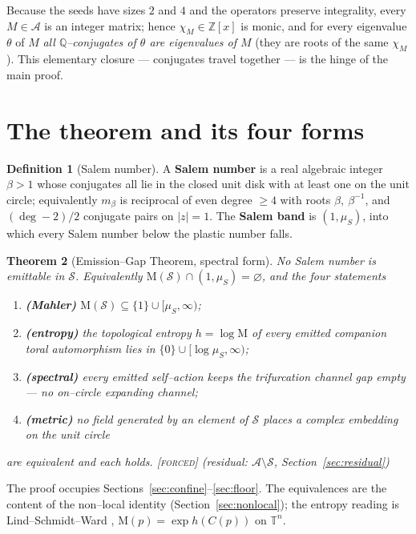 \documentclass[11pt]{article}
\theoremstyle{plain}
\newtheorem{theorem}{Theorem}[section]
\theoremstyle{definition}
\newtheorem{definition}[theorem]{Definition}
\theoremstyle{remark}
\newcommand{\forced}{\textcolor{forcedc}{\textsc{[forced]}}}
\newcommand{\Q}{\mathbb{Q}}
\newcommand{\Z}{\mathbb{Z}}
\newcommand{\T}{\mathbb{T}}
\newcommand{\Mah}{\mathrm{M}}
\newcommand{\charp}{\chi}
\newcommand{\abs}[1]{\left\lvert #1 \right\rvert}
\newcommand{\Scal}{\mathcal{S}}
\newcommand{\Acal}{\mathcal{A}}
\begin{document}
Because the seeds have sizes $2$ and $4$ and the operators preserve integrality, every $M\in\Acal$ is an integer matrix; hence $\charp_M\in\Z[x]$ is monic, and for every eigenvalue $\theta$ of $M$ \emph{all $\Q$--conjugates of $\theta$ are eigenvalues of $M$} (they are roots of the same $\charp_M$). This elementary closure --- conjugates travel together --- is the hinge of the main proof.

\section{The theorem and its four forms}\label{sec:theorem}

\begin{definition}[Salem number]\label{def:salem}
A \textbf{Salem number} is a real algebraic integer $\beta>1$ whose conjugates all lie in the closed unit disk with at least one on the unit circle; equivalently $m_\beta$ is reciprocal of even degree $\ge4$ with roots $\beta,\ \beta^{-1}$, and $(\deg-2)/2$ conjugate pairs on $\abs z=1$. The \textbf{Salem band} is $(1,\mu_S)$, into which every Salem number below the plastic number falls.
\end{definition}

\begin{theorem}[Emission--Gap Theorem, spectral form]\label{thm:main}
No Salem number is emittable in $\Scal$. Equivalently $\Mah(\Scal)\cap(1,\mu_S)=\varnothing$, and the four statements
\begin{enumerate}[label=\textup{(\roman*)},leftmargin=2.2em,topsep=2pt,itemsep=1pt]
\item \textbf{(Mahler)} $\Mah(\Scal)\subseteq\{1\}\cup[\mu_S,\infty)$;
\item \textbf{(entropy)} the topological entropy $h=\log\Mah$ of every emitted companion toral automorphism lies in $\{0\}\cup[\log\mu_S,\infty)$;
\item \textbf{(spectral)} every emitted self--action keeps the trifurcation channel gap empty --- no on--circle expanding channel;
\item \textbf{(metric)} no field generated by an element of $\Scal$ places a complex embedding on the unit circle
\end{enumerate}
are equivalent and each holds. \forced{} (residual: $\Acal\setminus\Scal$, Section~\ref{sec:residual})
\end{theorem}

The proof occupies Sections~\ref{sec:confine}--\ref{sec:floor}. The equivalences are the content of the non--local identity (Section~\ref{sec:nonlocal}); the entropy reading is Lind--Schmidt--Ward \cite{LSW}, $\Mah(p)=\exp h(C(p))$ on $\T^n$.
\end{document}
